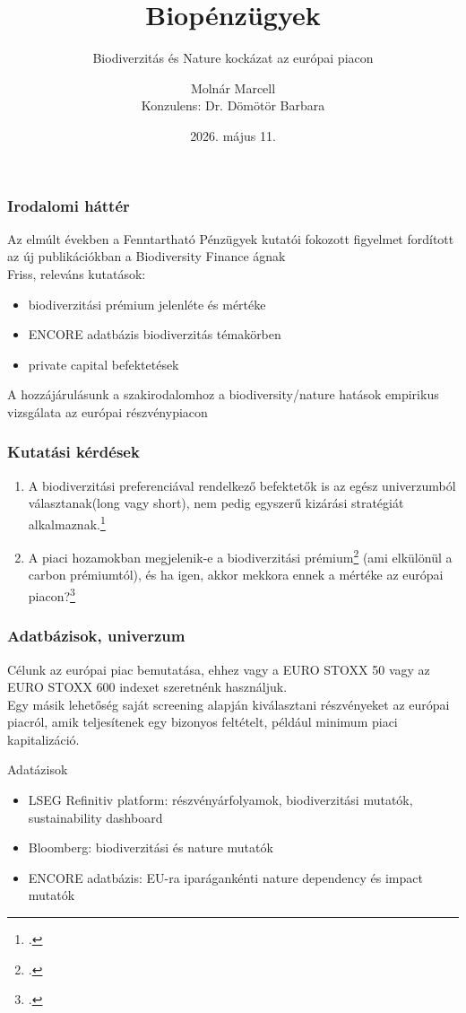\documentclass[aspectratio=169,notheorems]{corvinusmetropolis}
\title{Biopénzügyek}
\subtitle{Biodiverzitás és Nature kockázat az európai piacon}
\author{Molnár Marcell\\Konzulens: Dr. Dömötör Barbara}
\institute[Corvinus University]
  {
  Pénzügy és számvitel alapszak\\
  Pénzügy specializáció\\
  Email: \putemail\\
  }
\date{2026. május 11.}
\begin{document}
\simpleopen{}

\begin{frame}
  \frametitle{Irodalomi háttér}
  Az elmúlt években a Fenntartható Pénzügyek kutatói fokozott figyelmet fordított az új publikációkban a Biodiversity Finance ágnak\\ 
  Friss, releváns kutatások:
  \begin{itemize}
    \item \alert{biodiverzitási prémium} jelenléte és mértéke \parencite{coqueret_biodiversity_2024, naffa_biodiversity_2024}
    \item \alert{ENCORE adatbázis} biodiverzitás témakörben \parencite{clement_mapping_2025}
    \item \alert{private capital befektetések} \parencite{flammer_biodiversity_2025}\\
  \end{itemize}
  A hozzájárulásunk a szakirodalomhoz a biodiversity/nature hatások empirikus vizsgálata az európai részvénypiacon
\end{frame}

\begin{frame}
  \frametitle{Kutatási kérdések}
  \begin{enumerate}
    \item A biodiverzitási preferenciával rendelkező befektetők is az egész univerzumból választanak(long vagy short), nem pedig egyszerű kizárási stratégiát alkalmaznak.\footcite{pedersen_responsible_2021} 
    \item A piaci hozamokban megjelenik-e a biodiverzitási prémium\footcite{coqueret_biodiversity_2024} (ami elkülönül a carbon prémiumtól), és ha igen, akkor mekkora ennek a mértéke az európai piacon?\footcite{naffa_biodiversity_2024}
  \end{enumerate}
\end{frame}

\begin{frame}
  \frametitle{Adatbázisok, univerzum}
  Célunk az európai piac bemutatása, ehhez vagy a \alert{EURO STOXX 50} vagy az \alert{EURO STOXX 600} indexet szeretnénk használjuk.\\
   Egy másik lehetőség \alert{saját screening alapján} kiválasztani részvényeket az európai piacról, amik \alert{teljesítenek egy bizonyos feltételt}, például minimum piaci kapitalizáció.\\
  \medskip
  \begin{block}{Adatázisok}
    \begin{itemize}
    \item \alert{LSEG Refinitiv platform}: részvényárfolyamok, biodiverzitási mutatók, sustainability dashboard
    \item \alert{Bloomberg}: biodiverzitási és nature mutatók
      \item \alert{ENCORE adatbázis}: EU-ra iparágankénti nature dependency és impact mutatók
    \end{itemize}
  \end{block}
\end{frame}

\end{document}
